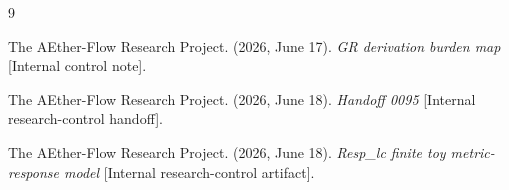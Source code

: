 \documentclass[11pt]{article}
\begin{document}
\begin{thebibliography}{9}

The AEther-Flow Research Project. (2026, June 17). \emph{GR derivation
burden map} [Internal control note].

The AEther-Flow Research Project. (2026, June 18). \emph{Handoff 0095}
[Internal research-control handoff].

The AEther-Flow Research Project. (2026, June 18). \emph{Resp\_lc
finite toy metric-response model} [Internal research-control artifact].

\end{thebibliography}
\end{document}
